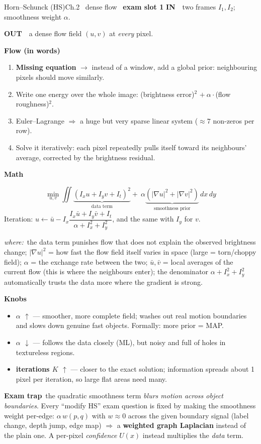 \documentclass[9pt,a4paper]{extarticle}
\newcommand{\IN}{\textbf{\color{cIn}IN}\ }
\newcommand{\OUT}{\par\textbf{\color{cOut}OUT}\ }
\newcommand{\FLOW}{\par\smallskip\textbf{Flow (in words)}\par\nopagebreak}
\newcommand{\MATH}{\par\smallskip\textbf{Math}\par\nopagebreak}
\newcommand{\KNOBS}{\par\smallskip\textbf{Knobs}\par\nopagebreak}
\newcommand{\TRAP}{\par\smallskip\textbf{\color{cTrap}Exam trap}\ }
\newcommand{\WHERE}{\par\textit{where:}\ }
\newcommand{\up}{$\uparrow$}
\newcommand{\dn}{$\downarrow$}
\newcommand{\kn}[2]{\item \textbf{#1} --- #2}
\newcommand{\Ix}{I_x}\newcommand{\Iy}{I_y}\newcommand{\It}{I_t}
\begin{document}
\begin{card}{Horn--Schunck (HS)}{Ch.2 \textbullet\ dense flow \textbullet\ \textbf{exam slot 1}}
\IN\ two frames $I_1,I_2$; smoothness weight $\alpha$.
\OUT\ a dense flow field $(u,v)$ at \emph{every} pixel.

\FLOW
\begin{enumerate}
  \item \textbf{Missing equation} $\to$ instead of a window, add a global prior: neighbouring pixels should move similarly.
  \item Write one energy over the whole image: (brightness error)$^2$ $+\ \alpha\cdot$(flow roughness)$^2$.
  \item Euler--Lagrange $\Rightarrow$ a huge but very sparse linear system ($\approx7$ non-zeros per row).
  \item Solve it iteratively: each pixel repeatedly pulls itself toward its neighbours' average, corrected by the brightness residual.
\end{enumerate}

\MATH
\[ \min_{u,v}\iint \underbrace{(\Ix u+\Iy v+\It)^2}_{\text{data term}}+\ \alpha\underbrace{(|\nabla u|^2+|\nabla v|^2)}_{\text{smoothness prior}}\,dx\,dy \]
Iteration: $u\leftarrow\bar u-\Ix\dfrac{\Ix\bar u+\Iy\bar v+\It}{\alpha+\Ix^2+\Iy^2}$, and the same with $\Iy$ for $v$.
\WHERE the data term punishes flow that does not explain the observed brightness change; $|\nabla u|^2$ = how fast the flow field itself varies in space (large = torn/choppy field); $\alpha$ = the exchange rate between the two; $\bar u,\bar v$ = local averages of the current flow (this is where the neighbours enter); the denominator $\alpha+\Ix^2+\Iy^2$ automatically trusts the data more where the gradient is strong.

\KNOBS
\begin{itemize}
  \kn{$\alpha$ \up}{smoother, more complete field; washes out real motion boundaries and slows down genuine fast objects. Formally: more prior = MAP.}
  \kn{$\alpha$ \dn}{follows the data closely (ML), but noisy and full of holes in textureless regions.}
  \kn{iterations $K$ \up}{closer to the exact solution; information spreads about 1 pixel per iteration, so large flat areas need many.}
\end{itemize}
\TRAP the quadratic smoothness term \emph{blurs motion across object boundaries}. Every ``modify HS'' exam question is fixed by making the smoothness weight per-edge: $\alpha\,w(p,q)$ with $w\approx0$ across the given boundary signal (label change, depth jump, edge map) $\Rightarrow$ a \textbf{weighted graph Laplacian} instead of the plain one. A per-pixel \emph{confidence} $U(x)$ instead multiplies the \emph{data} term.
\end{card}
\end{document}
